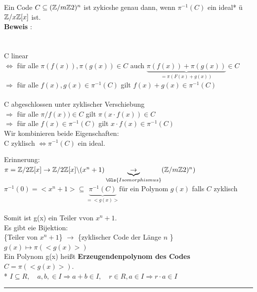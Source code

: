 \documentclass[9pt]{article}
\begin{document}
\begin{satz}
Ein Code $C \subseteq (\mathbb{Z} / m \mathbb{Z}{2)^n}$ ist zykicshe genau dann, wenn $\pi^{-1}(C)$ ein \Gls{ideal}* ü $\mathbb{Z} / x \mathbb{Z}[x]$ ist. \\ 
\textbf{Beweis} :\\
\\
 \\
C linear \\
$\Leftrightarrow$ für alle $\pi(f(x)), \pi(g(x)) \in C$ auch $\underbrace{\pi(f(x)) + \pi(g(x))}_{= \pi (F(x)+g(x))} \in C$ \\
$\Rightarrow$ für alle $f(x), g(x) \in \pi^{-1}(C)$ gilt $f(x) + g(x) \in \pi^{-1}(C)$ \\
 \\
C abgeschlossen unter zyklischer Verschiebung \\
$\Rightarrow$ für alle $\pi/f(x)) \in C $ gilt $\pi(x \cdot f(x)) \in C$ \\
$\Rightarrow$ für alle $f(x) \in \pi^{-1}(C)$ gilt $x \cdot f(x) \in \pi^{-1}(C)$ \\
Wir kombinieren beide Eigenschaften: \\
 C zyklisch $\Leftrightarrow \pi^{-1}(C)$ ein \Gls{ideal}. \\ \newline
 
 Erinnerung: \\
 $\pi = \zatx{2} \rightarrow \zatx{2} \backslash (x^n+1) \underbrace{\rightarrow}_{\Gls{Isomorphismus}} (\zat{2})^n)$ \\
 $\pi^{-1}(0) = <x^n+1> \subseteq \underbrace{\pi^{-1}(C)}_{=<g(x)>} \text{für ein Polynom } g(x)$ falls $C$ zyklisch \\ \\
 Somit ist g(x) ein Teiler vvon $x^n+1$. \\
 Es gibt eie Bijektion:  \\
 \{Teiler von $x^n+1$\} $\longrightarrow$ \{zyklischer Code der Länge $n$ \} \\
 $g(x) \mapsto \pi(<g(x)>)$ \\
 Ein Polynom g(x) heißt \textbf{Erzeugendenpolynom des Codes} $C = \pi(<g(x)>)$. \\ \newline
* $I \subseteq R, \quad a,b, \in I \Rightarrow a+b \in I, \quad r \in R, a \in I \Rightarrow r \cdot a \in I$
 \end{satz} \noindent \rule{8cm}{0.4pt}
\end{document}
